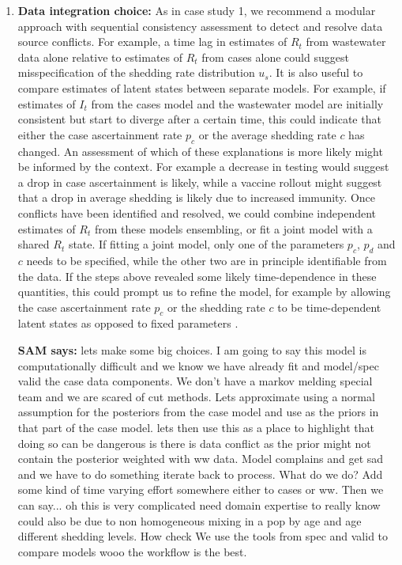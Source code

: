\documentclass{article}
\begin{document}
\begin{enumerate}
\begin{enumerate}
    \item \textbf{Data integration choice:} As in case study 1, we recommend a modular approach with sequential consistency assessment to detect and resolve data source conflicts. For example, a time lag in estimates of $R_t$ from wastewater data alone relative to estimates of $R_t$ from cases alone could suggest misspecification of the shedding rate distribution $u_s$.  It is also useful to compare estimates of latent states between separate models. For example, if estimates of $I_t$ from the cases model and the wastewater model are initially consistent but start to diverge after a certain time, this could indicate that either the case ascertainment rate $p_c$ or the average shedding rate $c$ has changed. An assessment of which of these explanations is more likely might be informed by the context. For example a decrease in testing would suggest a drop in case ascertainment is likely, while a vaccine rollout might suggest that a drop in average shedding is likely due to increased immunity. 
    Once conflicts have been identified and resolved, we could combine independent estimates of $R_t$ from these models ensembling, or fit a joint model with a shared $R_t$ state. If fitting a joint model, only one of the parameters $p_c$, $p_d$ and $c$ needs to be specified, while the other two are in principle identifiable from the data. If the steps above revealed some likely time-dependence in these quantities, this could prompt us to refine the model, for example by allowing the case ascertainment rate $p_c$ or the shedding rate $c$ to be time-dependent latent states as opposed to fixed parameters \citep{watson2024jointly}. 

{\bf SAM says:} lets make some big choices. 
I am going to say this model is computationally difficult and we know we have already fit and model/spec valid the case data components. 
We don't have a markov melding special team and we are scared of cut methods. Lets approximate using a normal assumption for the posteriors from the case model and use as the priors in that part of the case model. 
lets then use this as a place to highlight that doing so can be dangerous is there is data conflict as the prior might not contain the posterior weighted with ww data. Model complains and get sad and we have to do something iterate back to process. What do we do? 
Add some kind of time varying effort somewhere either to cases or ww. 
Then we can say... oh this is very complicated need domain expertise to really know could also be due to non homogeneous mixing in a pop by age and age different shedding levels. 
How check
We use the tools from spec and valid to compare models wooo the workflow is the best.





\end{enumerate}
\end{enumerate}
\end{document}
